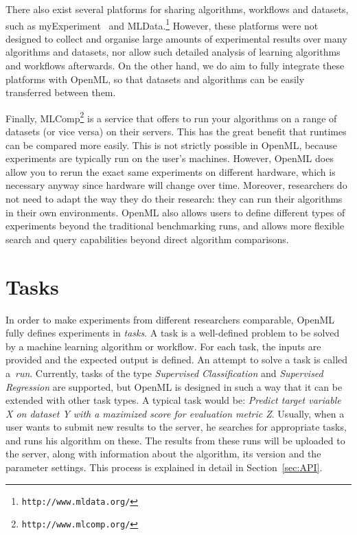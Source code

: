 \documentclass[10pt, twoside]{article}
\begin{document}
There also exist several platforms for sharing algorithms, workflows and datasets, such as myExperiment~\cite{Roure2009,Goble2010} and MLData.\footnote{\texttt{http://www.mldata.org/}} However, these platforms were not designed to collect and organise large amounts of experimental results over many algorithms and datasets, nor allow such detailed analysis of learning algorithms and workflows afterwards. On the other hand, we do aim to fully integrate these platforms with OpenML, so that datasets and algorithms can be easily transferred between them. 

Finally, MLComp\footnote{\texttt{http://www.mlcomp.org/}} is a service that offers to run your algorithms on a range of datasets (or vice versa) on their servers. This has the great benefit that runtimes can be compared more easily. This is not strictly possible in OpenML, because experiments are typically run on the user's machines. However, OpenML does allow you to rerun the exact same experiments on different hardware, which is necessary anyway since hardware will change over time. Moreover, researchers do not need to adapt the way they do their research: 
they can run their algorithms in their own environments. OpenML also allows users to define different types of experiments beyond the traditional benchmarking runs, and allows more flexible search and query capabilities beyond direct algorithm comparisons.

\section{Tasks}
\label{sec:Tasks}
In order to make experiments from different researchers comparable, OpenML fully defines experiments in \emph{tasks}. A task is a well-defined problem to be solved by a machine learning algorithm or workflow. For each task, the inputs are provided and the expected output is defined.  An attempt to solve a task is called a~\emph{run}. Currently, tasks of the type \emph{Supervised Classification} and \emph{Supervised Regression} are supported, but OpenML is designed in such a way that it can be extended with other task types. A typical task would be: \emph{Predict target variable X on dataset Y with a maximized score for evaluation metric Z}. Usually, when a user wants to submit new results to the server, he searches for appropriate tasks, and runs his algorithm on these. The results from these runs will be uploaded to the server, along with information about the algorithm, its version and the parameter settings. This process is explained in detail in Section~\ref{sec:API}.
\end{document}
